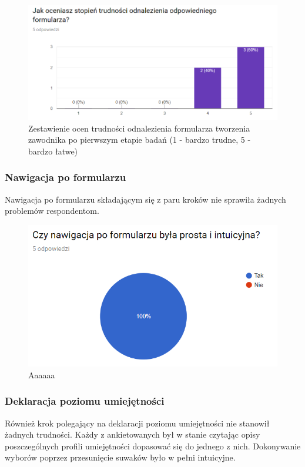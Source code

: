 \begin{figure}[ht]
\centering
\includegraphics[width=0.95\linewidth]{07-walidacja/rys/profil_trudnosc_odnalezienia.PNG}
\caption{Zestawienie ocen trudności odnalezienia formularza tworzenia zawodnika po pierwszym etapie badań (1 - bardzo trudne, 5 - bardzo łatwe)}
\label{fig:view-player-skill}
\end{figure}


\subsubsection{Nawigacja po formularzu}

Nawigacja po formularzu składającym się z paru kroków nie sprawiła żadnych problemów respondentom.


\begin{figure}[H]
\centering
\includegraphics[width=0.7\linewidth]{07-walidacja/rys/p_nawigacja.PNG}
\caption{Aaaaaa}
\label{fig:view-player-skill}
\end{figure}

\subsubsection{Deklaracja poziomu umiejętności}

  Również krok polegający na deklaracji poziomu umiejętności nie stanowił żadnych trudności. Każdy z ankietowanych był w stanie czytając opisy poszczególnych profili umiejętności dopasować się do jednego z nich. Dokonywanie wyborów poprzez przesunięcie suwaków było w pełni intuicyjne.
  
